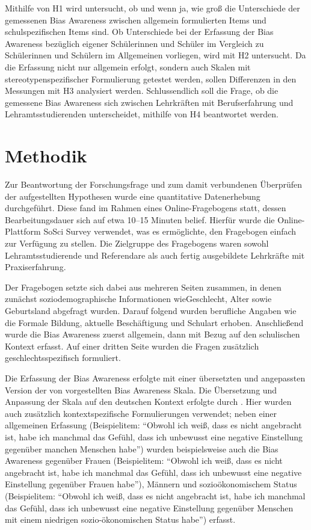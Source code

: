Mithilfe von H1 wird untersucht, ob und wenn ja, wie groß die Unterschiede der gemessenen Bias Awareness zwischen allgemein formulierten Items und schulspezifischen Items sind.
Ob Unterschiede bei der Erfassung der Bias Awareness bezüglich eigener Schülerinnen und Schüler im Vergleich zu Schülerinnen und Schülern im Allgemeinen vorliegen, wird mit H2 untersucht.
Da die Erfassung nicht nur allgemein erfolgt, sondern auch Skalen mit stereotypenspezifischer Formulierung getestet werden, sollen Differenzen in den Messungen mit H3 analysiert werden.
Schlussendlich soll die Frage, ob die gemessene Bias Awareness sich zwischen Lehrkräften mit Berufserfahrung und Lehramtsstudierenden unterscheidet, mithilfe von H4 beantwortet werden.


\section{Methodik}
\label{sec:methodik}

Zur Beantwortung der Forschungsfrage und zum damit verbundenen Überprüfen der aufgestellten Hypothesen wurde eine quantitative Datenerhebung durchgeführt.
Diese fand im Rahmen eines Online-Fragebogens statt, dessen Bearbeitungsdauer sich auf etwa 10--15 Minuten belief.
Hierfür wurde die Online-Plattform SoSci Survey \citep{leiner2024sosci} verwendet, was es ermöglichte, den Fragebogen einfach zur Verfügung zu stellen.
Die Zielgruppe des Fragebogens waren sowohl Lehramtsstudierende und Referendare als auch fertig ausgebildete Lehrkräfte mit Praxiserfahrung.

Der Fragebogen setzte sich dabei aus mehreren Seiten zusammen, in denen zunächst soziodemographische Informationen wie\break Geschlecht, Alter sowie Geburtsland abgefragt wurden.
Darauf folgend wurden berufliche Angaben wie die Formale Bildung, aktuelle Beschäftigung und Schulart erhoben.
Anschließend wurde die Bias Awareness zuerst allgemein, dann mit Bezug auf den schulischen Kontext erfasst.
Auf einer dritten Seite wurden die Fragen zusätzlich geschlechtsspezifisch formuliert.

Die Erfassung der Bias Awareness erfolgte mit einer übersetzten und angepassten Version der von \citet{perry2015modern} vorgestellten Bias Awareness Skala.
Die Übersetzung und Anpassung der Skala auf den deutschen Kontext erfolgte durch \citet{bonefeld2022reflexion}.
Hier wurden auch zusätzlich kontextspezifische Formulierungen verwendet; neben einer allgemeinen Erfassung (Beispielitem: ``Obwohl ich weiß, dass es nicht angebracht ist, habe ich manchmal das Gefühl, dass ich unbewusst eine negative Einstellung gegenüber manchen Menschen habe'') wurden beispielsweise auch die Bias Awareness gegenüber Frauen (Beispielitem: ``Obwohl ich weiß, dass es nicht angebracht ist, habe ich manchmal das Gefühl, dass ich unbewusst eine negative Einstellung gegenüber Frauen habe''), Männern und sozioökonomischem Status (Beispielitem: ``Obwohl ich weiß, dass es nicht angebracht ist, habe ich manchmal das Gefühl, dass ich unbewusst eine negative Einstellung gegenüber Menschen mit einem niedrigen sozio-ökonomischen Status habe'') erfasst.

